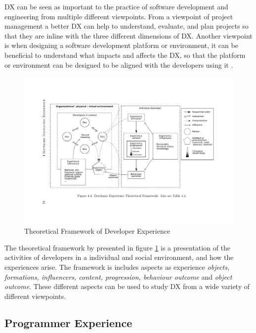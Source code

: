 \documentclass[english, 12pt, a4paper, sci, utf8, a-1b, online]{aaltothesis}
\begin{document}
DX can be seen as important to the practice of software development and engineering from multiple different viewpoints. From a viewpoint of project management a better DX can help to understand, evaluate, and plan projects so that they are inline with the three different dimensions of DX. Another viewpoint is when designing a software development platform or environment, it can be beneficial to understand what impacts and affects the DX, so that the platform or environment can be designed to be aligned with the developers using it \parencite{fagerholm-dx-concept-and-definition}.

\begin{figure}
  \captionsetup{width=0.6\textwidth}
  \caption{Theoretical Framework of Developer Experience \parencite{fagerholm-doctoral-thesis}}
  \begin{center}
    \includegraphics[width=\textwidth]{theoretical-framework.pdf}
  \end{center}
  \label{figure:theoretical-framework}
\end{figure}

The theoretical framework by \textcite{fagerholm-doctoral-thesis} presented in figure \ref{figure:theoretical-framework} is a presentation of the activities of developers in a individual and social environment, and how the experiences arise. The framework is includes aspects as experience \textit{objects, formations, influencers, content, progression, behaviour outcome} and \textit{object outcome}. These different aspects can be used to study DX from a wide variety of different viewpoints.

\subsection{Programmer Experience}
\end{document}
